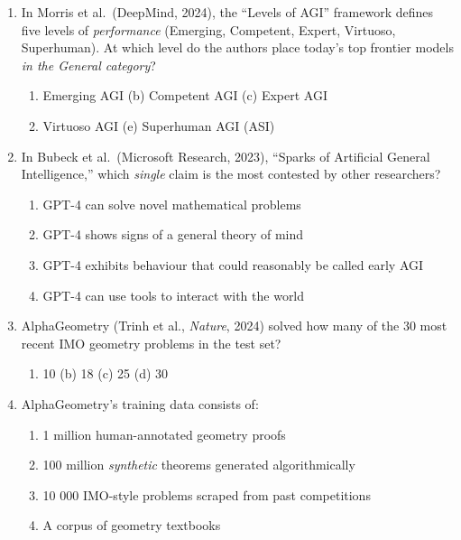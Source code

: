 \documentclass[11pt,a4paper]{article}
\begin{document}
\begin{enumerate}[label=Q\arabic*.]

\item In Morris et al.\ (DeepMind, 2024), the ``Levels of AGI'' framework
      defines five levels of \emph{performance} (Emerging, Competent, Expert,
      Virtuoso, Superhuman). At which level do the authors place today's
      top frontier models \emph{in the General category}?
\begin{enumerate}[label=(\alph*)]
    \item Emerging AGI \qquad (b) Competent AGI \qquad (c) Expert AGI
    \item Virtuoso AGI \qquad (e) Superhuman AGI (ASI)
\end{enumerate}

\item In Bubeck et al.\ (Microsoft Research, 2023), ``Sparks of Artificial
      General Intelligence,'' which \emph{single} claim is the most
      contested by other researchers?
\begin{enumerate}[label=(\alph*)]
    \item GPT-4 can solve novel mathematical problems
    \item GPT-4 shows signs of a general theory of mind
    \item GPT-4 exhibits behaviour that could reasonably be called
          early AGI
    \item GPT-4 can use tools to interact with the world
\end{enumerate}

\item AlphaGeometry (Trinh et al., \emph{Nature}, 2024) solved how many of
      the 30 most recent IMO geometry problems in the test set?
\begin{enumerate}[label=(\alph*)]
    \item 10 \qquad (b) 18 \qquad (c) 25 \qquad (d) 30
\end{enumerate}

\item AlphaGeometry's training data consists of:
\begin{enumerate}[label=(\alph*)]
    \item 1 million human-annotated geometry proofs
    \item 100 million \emph{synthetic} theorems generated algorithmically
    \item 10 000 IMO-style problems scraped from past competitions
    \item A corpus of geometry textbooks
\end{enumerate}


\end{enumerate}
\end{document}
